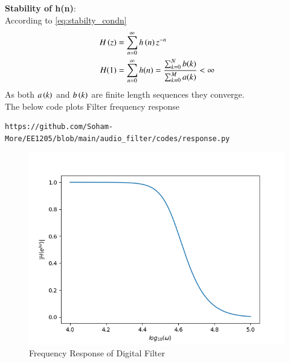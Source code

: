 \documentclass[journal,12pt,twocolumn]{IEEEtran}
\theoremstyle{remark}
\begin{document}
\begin{enumerate}[label=\thesection.\arabic*]
\textbf{Stability of h(n)}:\\
According to \eqref{eq:stabilty_condn}
\begin{align}
H\left(z\right) &= \sum_{n = 0}^{\infty} h\left(n\right)z^{-n}\\
H(1)&= \sum_{n = 0}^{\infty}h(n)  = \frac{\sum_{k = 0}^{N}b(k)}{\sum_{k = 0}^{M}a(k)}< \infty
\end{align}
As both $a\left(k\right)$ and $b\left(k\right)$ are finite length sequences they converge.\\
The below code plots Filter frequency response
\begin{lstlisting}
https://github.com/Soham-More/EE1205/blob/main/audio_filter/codes/response.py
\end{lstlisting}
\begin{figure}[h!]
\centering
\includegraphics[width=1\columnwidth]{figs/freq_res.png}
\caption{Frequency Response of Digital Filter}
\label{fig:H(w)_6}
\end{figure}


\end{enumerate}
\end{document}
